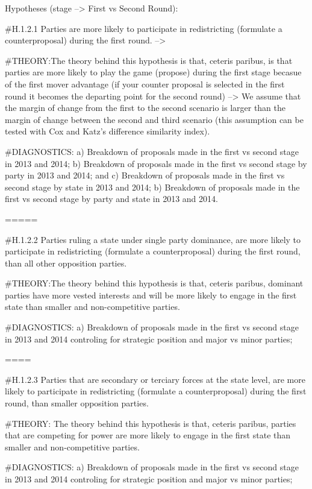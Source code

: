 \documentclass[
]{article}
\begin{document}
Hypotheses (stage --\textgreater{} First vs Second Round):

\#H.1.2.1 Parties are more likely to participate in redistricting
(formulate a counterproposal) during the first round. --\textgreater{}

\#THEORY:The theory behind this hypothesis is that, ceteris paribus, is
that parties are more likely to play the game (propose) during the first
stage becasue of the first mover advantage (if your counter proposal is
selected in the first round it becomes the departing point for the
second round) --\textgreater{} We assume that the margin of change from
the first to the second scenario is larger than the margin of change
between the second and third scenario (this assumption can be tested
with Cox and Katz's difference similarity index).

\#DIAGNOSTICS: a) Breakdown of proposals made in the first vs second
stage in 2013 and 2014; b) Breakdown of proposals made in the first vs
second stage by party in 2013 and 2014; and c) Breakdown of proposals
made in the first vs second stage by state in 2013 and 2014; b)
Breakdown of proposals made in the first vs second stage by party and
state in 2013 and 2014.

=====

\#H.1.2.2 Parties ruling a state under single party dominance, are more
likely to participate in redistricting (formulate a counterproposal)
during the first round, than all other opposition parties.

\#THEORY:The theory behind this hypothesis is that, ceteris paribus,
dominant parties have more vested interests and will be more likely to
engage in the first state than smaller and non-competitive parties.

\#DIAGNOSTICS: a) Breakdown of proposals made in the first vs second
stage in 2013 and 2014 controling for strategic position and major vs
minor parties;

====

\#H.1.2.3 Parties that are secondary or terciary forces at the state
level, are more likely to participate in redistricting (formulate a
counterproposal) during the first round, than smaller opposition
parties.

\#THEORY: The theory behind this hypothesis is that, ceteris paribus,
parties that are competing for power are more likely to engage in the
first state than smaller and non-competitive parties.

\#DIAGNOSTICS: a) Breakdown of proposals made in the first vs second
stage in 2013 and 2014 controling for strategic position and major vs
minor parties;
\end{document}
